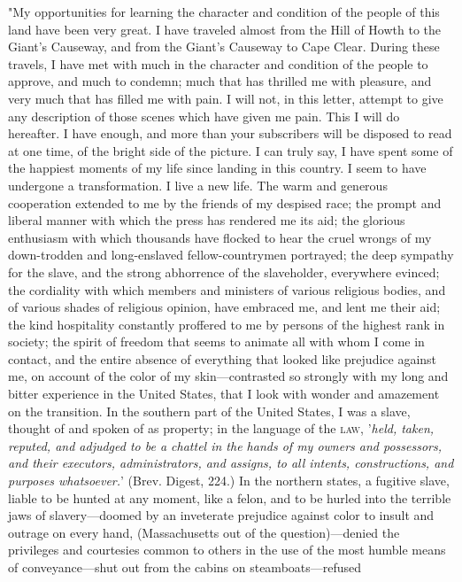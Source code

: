 "My opportunities for learning the character and condition of the people
of this land have been very great. I have traveled almost from the Hill
of Howth to the Giant's Causeway, and from the Giant's Causeway to Cape
Clear. During these travels, I have met with much in the character and
condition of the people to approve, and much to condemn; much that has
thrilled me with pleasure, and very much that has filled me with pain. I
will not, in this letter, attempt to give any description of those
scenes which have given me pain. This I will do hereafter. I have
enough, and more than your {}subscribers will be disposed to read at one
time, of the bright side of the picture. I can truly say, I have spent
some of the happiest moments of my life since landing in this country. I
seem to have undergone a transformation. I live a new life. The warm and
generous cooperation extended to me by the friends of my despised race;
the prompt and liberal manner with which the press has rendered me its
aid; the glorious enthusiasm with which thousands have flocked to hear
the cruel wrongs of my down-trodden and long-enslaved fellow-countrymen
portrayed; the deep sympathy for the slave, and the strong abhorrence of
the slaveholder, everywhere evinced; the cordiality with which members
and ministers of various religious bodies, and of various shades of
religious opinion, have embraced me, and lent me their aid; the kind
hospitality constantly proffered to me by persons of the highest rank in
society; the spirit of freedom that seems to animate all with whom I
come in contact, and the entire absence of everything that looked like
prejudice against me, on account of the color of my skin---contrasted so
strongly with my long and bitter experience in the United States, that I
look with wonder and amazement on the transition. In the southern part
of the United States, I was a slave, thought of and spoken of as
property; in the language of the \textsc{law}, {'}\emph{held, taken,
reputed, and adjudged to be a chattel in the hands of my owners and
possessors, and their executors, administrators, and assigns, to all
intents, constructions, and purposes whatsoever.}{'} (Brev. Digest,
224.) In the northern states, a fugitive slave, liable to be hunted at
any moment, like a felon, and to be hurled into the terrible jaws of
slavery---doomed by an inveterate prejudice against color to insult and
outrage on every hand, (Massachusetts out of the question)---denied the
privileges and courtesies common to others in the use of the most humble
means of conveyance---shut out from the cabins on steamboats---refused
